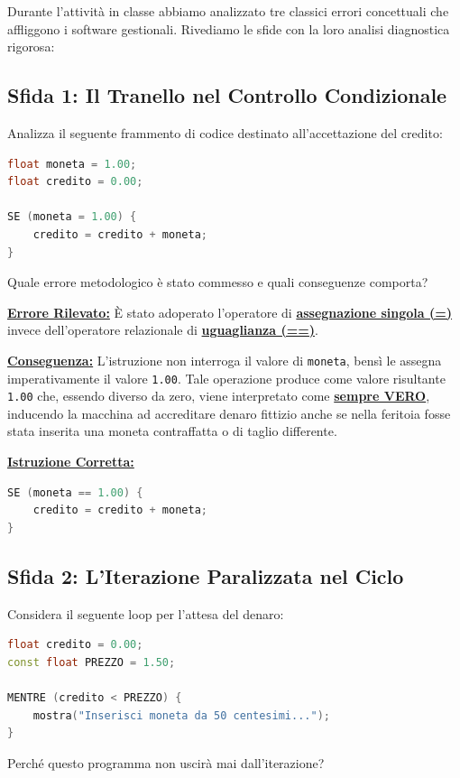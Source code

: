 Durante l'attività in classe abbiamo analizzato tre classici errori concettuali che affliggono i software gestionali. Rivediamo le sfide con la loro analisi diagnostica rigorosa:

\subsection{Sfida 1: Il Tranello nel Controllo Condizionale}

\begin{esercizio}
Analizza il seguente frammento di codice destinato all'accettazione del credito:
\begin{lstlisting}[language=C++]
float moneta = 1.00;
float credito = 0.00;

SE (moneta = 1.00) {
    credito = credito + moneta;
}
\end{lstlisting}
Quale errore metodologico è stato commesso e quali conseguenze comporta?
\end{esercizio}

\begin{soluzione}
\textbf{\underline{Errore Rilevato:}} È stato adoperato l'operatore di \textbf{\underline{assegnazione singola (=)}} invece dell'operatore relazionale di \textbf{\underline{uguaglianza (==)}}.

\vspace{0.3em}
\textbf{\underline{Conseguenza:}} L'istruzione non interroga il valore di \texttt{moneta}, bensì le assegna imperativamente il valore \texttt{1.00}. Tale operazione produce come valore risultante \texttt{1.00} che, essendo diverso da zero, viene interpretato come \textbf{\underline{sempre VERO}}, inducendo la macchina ad accreditare denaro fittizio anche se nella feritoia fosse stata inserita una moneta contraffatta o di taglio differente.

\vspace{0.3em}
\textbf{\underline{Istruzione Corretta:}}
\begin{lstlisting}[language=C++]
SE (moneta == 1.00) {
    credito = credito + moneta;
}
\end{lstlisting}
\end{soluzione}

\subsection{Sfida 2: L'Iterazione Paralizzata nel Ciclo}

\begin{esercizio}
Considera il seguente loop per l'attesa del denaro:
\begin{lstlisting}[language=C++]
float credito = 0.00;
const float PREZZO = 1.50;

MENTRE (credito < PREZZO) {
    mostra("Inserisci moneta da 50 centesimi...");
}
\end{lstlisting}
Perché questo programma non uscirà mai dall'iterazione?
\end{esercizio}

